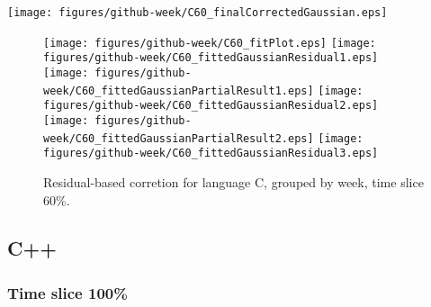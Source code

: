 \begin{center}
{\texttt{[image: figures/github-week/C60\_finalCorrectedGaussian.eps]}}
\end{center}

\FloatBarrier

\begin{figure}[t]
\centering
{}
{\texttt{[image: figures/github-week/C60\_fitPlot.eps]}}
{\texttt{[image: figures/github-week/C60\_fittedGaussianResidual1.eps]}}
{\texttt{[image: figures/github-week/C60\_fittedGaussianPartialResult1.eps]}}
{\texttt{[image: figures/github-week/C60\_fittedGaussianResidual2.eps]}}
{\texttt{[image: figures/github-week/C60\_fittedGaussianPartialResult2.eps]}}
{\texttt{[image: figures/github-week/C60\_fittedGaussianResidual3.eps]}}
\caption{Residual-based corretion for language C, grouped by week, time slice 60\%.}
\end{figure}


\FloatBarrier


\subsection{C++}

\subsubsection{Time slice 100\%}

